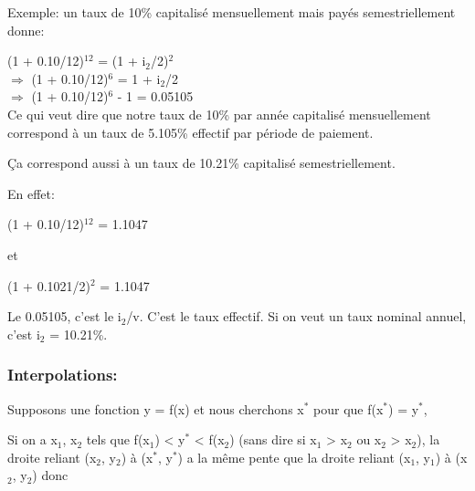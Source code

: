 \documentclass[11pt]{article}
\begin{document}
\begin{enumerate}
Exemple: un taux de 10\% capitalisé mensuellement mais payés semestriellement
donne:

(1 + 0.10/12)\(^{\text{12}}\) = (1 + i\(_{\text{2}}\)/2)\(^{\text{2}}\)      \\
\(\Rightarrow\) (1 + 0.10/12)\(^{\text{6}}\) = 1 + i\(_{\text{2}}\)/2       \\
\(\Rightarrow\) (1 + 0.10/12)\(^{\text{6}}\) - 1 = 0.05105    \\

Ce qui veut dire que notre taux de 10\% par année capitalisé mensuellement
correspond à un taux de 5.105\% effectif par période de paiement.

Ça correspond aussi à un taux de 10.21\% capitalisé semestriellement.

En effet:

(1 + 0.10/12)\(^{\text{12}}\) = 1.1047

et 

(1 + 0.1021/2)\(^{\text{2}}\) = 1.1047

Le 0.05105, c'est le i\(_{\text{2}}\)/v. C'est le taux effectif.  Si on veut un taux nominal
annuel, c'est i\(_{\text{2}}\) = 10.21\%.
\end{enumerate}

\subsubsection{Interpolations:}
\label{sec:org13f1555}

Supposons une fonction y = f(x) et nous cherchons x\(^{\text{*}}\) pour que f(x\(^{\text{*}}\)) = y\(^{\text{*}}\),

Si on a x\(_{\text{1}}\), x\(_{\text{2}}\) tels que f(x\(_{\text{1}}\)) < y\(^{\text{*}}\) < f(x\(_{\text{2}}\)) (sans dire si x\(_{\text{1}}\) > x\(_{\text{2}}\) ou x\(_{\text{2}}\) > x\(_{\text{2}}\)), la
droite reliant (x\(_{\text{2}}\), y\(_{\text{2}}\)) à (x\(^{\text{*}}\), y\(^{\text{*}}\)) a la même pente que la droite reliant (x\(_{\text{1}}\),
y\(_{\text{1}}\)) à (x\(_{\text{2}}\), y\(_{\text{2}}\)) donc
\end{document}
